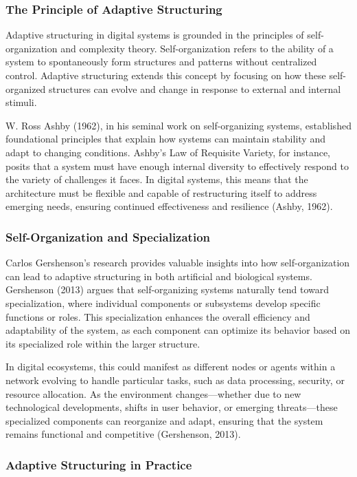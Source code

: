\documentclass[12pt,twoside]{article}
\begin{document}
\subsubsection{The Principle of Adaptive Structuring}

Adaptive structuring in digital systems is grounded in the principles of self-organization and complexity theory. Self-organization refers to the ability of a system to spontaneously form structures and patterns without centralized control. Adaptive structuring extends this concept by focusing on how these self-organized structures can evolve and change in response to external and internal stimuli.

W. Ross Ashby (1962), in his seminal work on self-organizing systems, established foundational principles that explain how systems can maintain stability and adapt to changing conditions. Ashby's Law of Requisite Variety, for instance, posits that a system must have enough internal diversity to effectively respond to the variety of challenges it faces. In digital systems, this means that the architecture must be flexible and capable of restructuring itself to address emerging needs, ensuring continued effectiveness and resilience (Ashby, 1962).

\subsubsection{Self-Organization and Specialization}

Carlos Gershenson's research provides valuable insights into how self-organization can lead to adaptive structuring in both artificial and biological systems. Gershenson (2013) argues that self-organizing systems naturally tend toward specialization, where individual components or subsystems develop specific functions or roles. This specialization enhances the overall efficiency and adaptability of the system, as each component can optimize its behavior based on its specialized role within the larger structure.

In digital ecosystems, this could manifest as different nodes or agents within a network evolving to handle particular tasks, such as data processing, security, or resource allocation. As the environment changes—whether due to new technological developments, shifts in user behavior, or emerging threats—these specialized components can reorganize and adapt, ensuring that the system remains functional and competitive (Gershenson, 2013).

\subsubsection{Adaptive Structuring in Practice}
\end{document}
